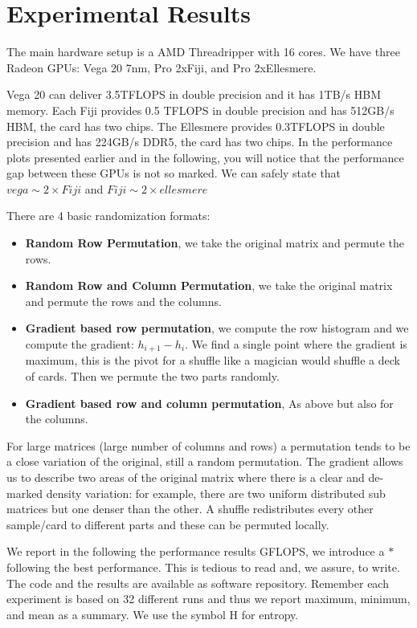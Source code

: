 \documentclass[acmsmall]{acmart}
\begin{document}
\section{Experimental Results}
\label{sec:experimentalresults}
The main hardware setup is a AMD Threadripper with 16 cores. We have
three Radeon GPUs: Vega 20 7nm, Pro 2xFiji, and Pro 2xEllesmere.

Vega 20 can deliver 3.5TFLOPS in double precision and it has 1TB/s HBM
memory. Each Fiji provides 0.5 TFLOPS in double precision and has
512GB/s HBM, the card has two chips.  The Ellesmere provides 0.3TFLOPS
in double precision and has 224GB/s DDR5, the card has two chips. In
the performance plots presented earlier and in the following, you will
notice that the performance gap between these GPUs is not so
marked. We can safely state that $vega \sim 2\times Fiji$ and $Fiji \sim
2\times ellesmere$



There are 4 basic randomization formats:
\begin{itemize}
  \item {\bf Random Row Permutation}, we take the original matrix and
    permute the rows.
  \item {\bf Random Row and Column Permutation}, we take the original
    matrix and permute the rows and the columns.
  \item {\bf Gradient based row permutation}, we compute the row
    histogram and we compute the gradient: $h_{i+1} - h_i$. We find a
    single point where the gradient is maximum, this is the pivot for
    a shuffle like a magician would shuffle a deck of cards.  Then we
    permute the two parts randomly.
  \item {\bf Gradient based row and column permutation}, As above but
    also for the columns.
\end{itemize}

For large matrices (large number of columns and rows) a permutation
tends to be a close variation of the original, still a random
permutation. The gradient allows us to describe two areas of the
original matrix where there is a clear and de-marked density
variation: for example, there are two uniform distributed sub matrices
but one denser than the other. A shuffle redistributes every other
sample/card to different parts and these can be permuted locally.


    
We report in the following the performance results GFLOPS, we
introduce a $\boldsymbol *$ following the best performance. This is
tedious to read and, we assure, to write. The code and the results are
available as software repository. Remember each experiment is based on
32 different runs and thus we report maximum, minimum, and mean as a
summary. We use the symbol H for entropy.







%

 

%
\end{document}
